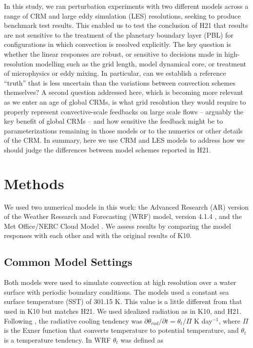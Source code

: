 \documentclass[draft]{agujournal2019}
\begin{document}
In this study, we ran perturbation experiments with two different models across
a range of CRM and large eddy simulation (LES) resolutions, seeking to produce
benchmark test results. This enabled us to test the conclusion of H21 that
results are not sensitive to the treatment of the planetary boundary layer (PBL)
for configurations in which convection is resolved explicitly. The key question
is whether the linear responses are robust, or sensitive to decisions made in
high-resolution modelling such as the grid length, model dynamical core, or
treatment of microphysics or eddy mixing. In particular, can we establish a
reference ``truth'' that is less uncertain than the variations between
convection schemes themselves? A second question addressed here, which is
becoming more relevant as we enter an age of global CRMs, is what grid
resolution they would require to properly represent convective-scale feedbacks
on large scale flows -- arguably the key benefit of global CRMs -- and how
sensitive the feedback might be to parameterizations remaining in those models
or to the numerics or other details of the CRM. In summary, here we use CRM and
LES models to address how we should judge the differences between model schemes
reported in H21.

\section{Methods}
\label{sec:methods}

We used two numerical models in this work: the Advanced Research (AR) version of
the Weather Research and Forecasting (WRF) model, version 4.1.4
\cite{Skamarock_2019}, and the Met Office/NERC Cloud Model
\cite<MONC,>{Brown_2020}.  We assess results by comparing the model responses
with each other and with the original results of K10.

\subsection{Common Model Settings}

Both models were used to simulate convection at high resolution over a water
surface with periodic boundary conditions. The models used a constant sea
surface temperature (SST) of 301.15 K. This value is a little different from
that used in K10 but matches H21. We used idealized radiation as in K10,
 and H21. Following , the
radiative cooling tendency was $\partial \theta_{rad} / \partial t =
\theta_t/\Pi$ K day$^{-1}$, where $\Pi$ is the Exner function that converts
temperature to potential temperature, and $\theta_t$ is a temperature tendency.
In WRF $\theta_t$ was defined as
\end{document}
